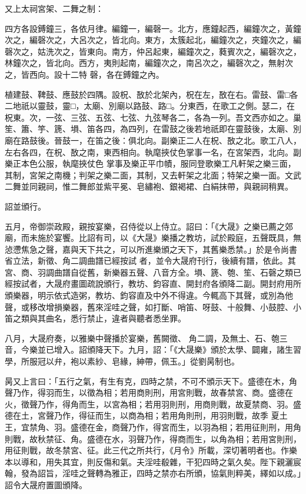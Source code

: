 \begin{pinyinscope}
 又上太祠宮架、二舞之制：



 四方各設鎛鐘三，各依月律。編鐘一，編磬一。北方，應鐘起西，編鐘次之，黃鐘次之，編磬次之，大呂次之，皆北向。東方，太簇起北，編鐘次之，夾鐘次之，編磬次之，姑洗次之，皆東向。南方，仲呂起東，編鐘次之，蕤賓次之，編磬次之，林鐘次之，皆北向。西方，夷則起南，編鐘次之，南呂次之，編磬次之，無射次之，皆西向。設十二特
 磬，各在鎛鐘之內。



 植建鼓、鞞鼓、應鼓於四隅。設柷、敔於北架內，柷在左，敔在右。雷鼓、雷□各二地祇以靈鼓，靈□，太廟、別廟以路鼓、路□。分東西，在歌工之側。瑟二，在柷東。次，一弦、三弦、五弦、七弦、九弦琴各二，各為一列。吾文西亦如之。巢笙、簫、竽、篪、塤、笛各四，為四列，在雷鼓之後若地祇即在靈鼓後，太廟、別廟在路鼓後。晉鼓一，在笛之後：俱北向。副樂正二人在柷、敔之北。歌工八人，左右各四，在柷、敔之南，東西相向。執麾挾仗色掌事一名，在宮架西，北向。副樂正本色公服，執麾挾仗色
 掌事及樂正平巾幘，服同登歌樂工凡軒架之樂三面，其制，宮架之南機；判架之樂二面，其制，又去軒架之北面；特架之樂一面。文武二舞並同親祠，惟二舞郎並紫平冕、皂繡袍、銀褐裙、白絹抹帶，與親祠稍異。



 詔並頒行。



 五月，帝御崇政殿，親按宴樂，召侍從以上侍立。詔曰：「《大晟》之樂已薦之郊廟，而未施於宴饗。比詔有司，以《大晟》樂播之教坊，試於殿庭，五聲既具，無惉懘焦急之聲，嘉與天下共之，可以所進樂頒之天下，其舊樂悉禁。」於是令尚書省立法，新徵、角二調曲譜已經按試
 者，並令大晟府刊行，後續有譜，依此。其宮、商、羽調曲譜自從舊，新樂器五聲、八音方全。塤、篪、匏、笙、石磬之類已經按試者，大晟府畫圖疏說頒行，教坊、鈞容直、開封府各頒降二副。開封府用所頒樂器，明示依式造粥，教坊、鈞容直及中外不得違。今輒高下其聲，或別為他聲，或移改增損樂器，舊來淫哇之聲，如打斷、哨笛、呀鼓、十般舞、小鼓腔、小笛之類與其曲名，悉行禁止，違者與聽者悉坐罪。



 八月，大晟府奏，以雅樂中聲播於宴樂，舊闕徵、
 角二調，及無土、石、匏三音，今樂並已增入。詔頒降天下。九月，詔：「《大晟樂》頒於太學、闢雍，諸生習學，所服冠以弁，袍以素紗、皂緣，紳帶，佩玉。」從劉昺制也。



 昺又上言曰：「五行之氣，有生有克，四時之禁，不可不頒示天下。盛德在木，角聲乃作，得羽而生，以徵為相；若用商則刑，用宮則戰，故春禁宮、商。盛德在火，徵聲乃作，得角而生，以宮為相；若用羽則刑，用商則戰，故夏禁商、羽。盛德在土，宮聲乃作，得征而生，以商為相；若用角則刑，用羽則戰，故季
 夏土王，宜禁角、羽。盛德在金，商聲乃作，得宮而生，以羽為相；若用征則刑，用角則戰，故秋禁征、角。盛德在水，羽聲乃作，得商而生，以角為相；若用宮則刑，用征則戰，故冬禁宮、征。此三代之所共行，《月令》所載，深切著明者也。作樂本以導和，用失其宜，則反傷和氣。夫淫哇殽雜，干犯四時之氣久矣。陛下親灑宸翰，發為詔旨，淫哇之聲轉為雅正，四時之禁亦右所頒，協氣則粹美，繹如以成。」詔令大晟府置圖頒降。




\end{pinyinscope}

